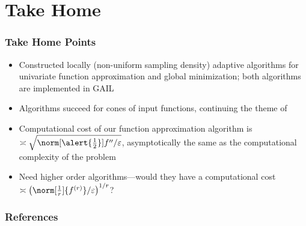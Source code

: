 \documentclass[12pt,compress,xcolor={usenames,dvipsnames}]{beamer} %
\begin{document}
\section{Take Home}
\begin{frame}
	\frametitle{Take Home Points }
\begin{itemize}
	\item Constructed \alert{locally} (non-uniform sampling density) adaptive algorithms for univariate function approximation and global minimization; both algorithms are implemented in GAIL
	
	\item Algorithms succeed for \alert{cones} of input functions, continuing the theme of \cites{HicEtal14a,HicEtal14b,Ton14a,Din15a,Jia16a}
	
	\item Computational cost of our function approximation algorithm is $\asymp \sqrt{\norm[\alert{\frac12}]{f''}/\varepsilon}$, asymptotically the same as the computational complexity of the problem
	
	\item Need \alert{higher order} algorithms---would they have a computational cost $\asymp \left(\norm[\frac1r]{f^{(r)}}/\varepsilon\right)^{1/r}$?
	
	
	\end{itemize}
	
\end{frame}

\begin{frame}[allowframebreaks]\frametitle{References}
	
\end{frame}
\end{document}
